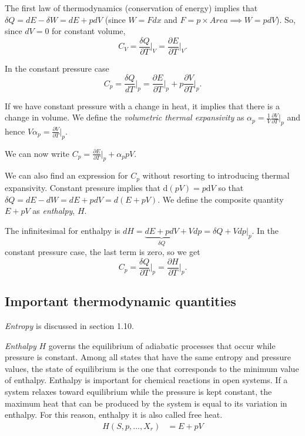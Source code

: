 The first law of thermodynamics (conservation of energy) implies that $\delta Q = dE - \delta W = dE + pdV$  (since $W = Fdx$ and $F=p\times Area \implies W = pdV$). So, since $dV=0$ for constant volume,
$$
	C_V = \frac{\delta Q}{\partial T}\bigg\vert_{V} = \frac{\partial E}{\partial T}\bigg\vert_{V}.
$$


In the constant pressure case 
$$
	C_p = \frac{\delta Q}{dT}\vert_{p} = \frac{\partial E}{\partial T}\vert_{p} + p\frac{\partial V}{\partial T}\vert_{p}.
$$

If we have constant pressure with a change in heat, it implies that there is a change in volume. We define the \emph{volumetric thermal expansivity} as $\alpha_p = \frac{1}{V}\frac{\partial V}{\partial T}\vert_{p}$ and hence $V\alpha_p =\frac{\partial V}{\partial T}\vert_{p}$.

We can now write $C_p = \frac{\partial E}{\partial T}\vert_{p} + \alpha_p pV$. 


We can also find an expression for $C_p$ without resorting to introducing thermal expansivity. Constant pressure implies that $\mathrm{d}(pV)=p\mathrm{d}V$ so that $\delta Q = dE - dW = dE +pdV = d(E+pV)$. We define the composite quantity $E+pV$ as \emph{enthalpy}, $H$.

The infinitesimal for enthalpy is $dH = \underbrace{dE +pdV}_{\delta Q}+ Vdp = \delta Q + Vdp\vert_{p}$. In the constant pressure case, the last term is zero, so we get 
$$
	C_p = \frac{\delta Q}{\partial T}\bigg\vert_{p} = \frac{\partial H}{\partial T}\bigg\vert_{p}. 
$$


\subsection{Important thermodynamic quantities}

\textit{Entropy} is discussed in section 1.10.


\textit{Enthalpy} $H$ governs the equilibrium of adiabatic processes that occur while pressure is
constant. Among all states that have the same entropy and pressure values, the state of equilibrium is the one that corresponds to the minimum value of enthalpy. Enthalpy is important for chemical reactions in open systems. If a system relaxes toward equilibrium while the pressure is kept constant, the maximum heat that can be produced by the system is equal to its variation in enthalpy. For this reason, enthalpy it is also called free heat.
\begin{align*}
	H(S, p, ..., X_{r}) &= E + pV
\end{align*}

